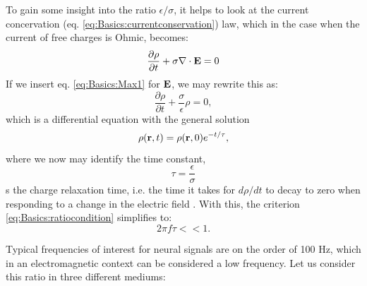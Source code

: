 To gain some insight into the ratio $\epsilon/\sigma$, it helps to look at the current concervation (eq. \ref{eq:Basics:currentconservation}) law, which in the case when the current of free charges is Ohmic, becomes:
\begin{equation}
\frac{\partial \rho}{\partial t} + \sigma \nabla \cdot {\bf E} = 0
\label{eq:Basics:OhmicConcervation}
\end{equation}
If we insert eq. \ref{eq:Basics:Max1} for ${\bf E}$, we may rewrite this as:
\begin{equation}
\frac{\partial \rho}{\partial t} + \frac{\sigma}{\epsilon} \rho = 0, 
\label{eq:Basics:OhmicConcervation2}
\end{equation}
which is a differential equation with the general solution
\begin{equation}
\rho({\bf r}, t) = \rho({\bf r}, 0)e^{-t/\tau}, 
\label{eq:Basics:relax}
\end{equation}
where we now may identify the time constant, 
\begin{equation}
\tau = \frac{\epsilon}{\sigma}
\label{eq:Basics:chargerelaxationtime}
\end{equation}
s the charge relaxation time, i.e. the time it takes for $d\rho/dt$ to decay to zero when responding to a change in the electric field . With this, the criterion \ref{eq:Basics:ratiocondition} simplifies to:
\begin{equation}
2 \pi f \tau << 1. 
\label{eq:Basics:ratiocondition2}
\end{equation}

Typical frequencies of interest for neural signals are on the order of 100 Hz, which in an electromagnetic context can be considered a low frequency. Let us consider this ratio in three different mediums: 

